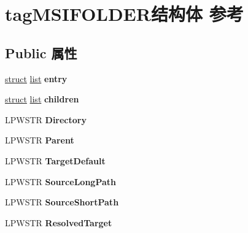 \hypertarget{structtag_m_s_i_f_o_l_d_e_r}{}\section{tag\+M\+S\+I\+F\+O\+L\+D\+E\+R结构体 参考}
\label{structtag_m_s_i_f_o_l_d_e_r}
\subsection*{Public 属性}
\begin{DoxyCompactItemize}
\item 
\mbox{\label{structtag_m_s_i_f_o_l_d_e_r_aff0e8146cd9074415253d89ea0eaf3b4}} 
\hyperlink{interfacestruct}{struct} \hyperlink{classlist}{list} {\bfseries entry}
\item 
\mbox{\label{structtag_m_s_i_f_o_l_d_e_r_aeb31813a0e804e89ca8e47d247aa333f}} 
\hyperlink{interfacestruct}{struct} \hyperlink{classlist}{list} {\bfseries children}
\item 
\mbox{\label{structtag_m_s_i_f_o_l_d_e_r_a7d418fac65f53ba218cb8be6cfa32888}} 
L\+P\+W\+S\+TR {\bfseries Directory}
\item 
\mbox{\label{structtag_m_s_i_f_o_l_d_e_r_abfb8622c097f482381aa8053c0cb072c}} 
L\+P\+W\+S\+TR {\bfseries Parent}
\item 
\mbox{\label{structtag_m_s_i_f_o_l_d_e_r_ae5bbe6796dc85fd7b423113e76eab743}} 
L\+P\+W\+S\+TR {\bfseries Target\+Default}
\item 
\mbox{\label{structtag_m_s_i_f_o_l_d_e_r_ac413176112d355a50b45a0f8c525d0d8}} 
L\+P\+W\+S\+TR {\bfseries Source\+Long\+Path}
\item 
\mbox{\label{structtag_m_s_i_f_o_l_d_e_r_a3277f4b1e4301eaec2b1df04492f6118}} 
L\+P\+W\+S\+TR {\bfseries Source\+Short\+Path}
\item 
\mbox{\label{structtag_m_s_i_f_o_l_d_e_r_a5bd69aace6dd540cb4c42961aa0032f2}} 
L\+P\+W\+S\+TR {\bfseries Resolved\+Target}

\end{DoxyCompactItemize}

